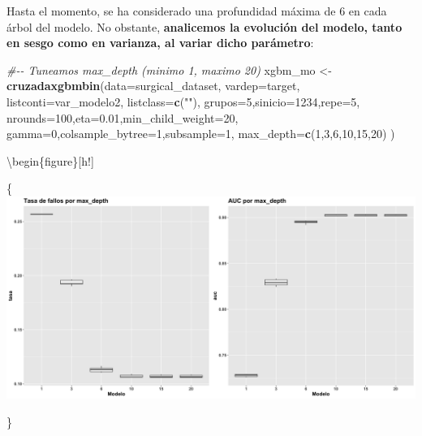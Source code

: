 \documentclass[
]{article}
\newenvironment{Shaded}{\begin{snugshade}}{\end{snugshade}}
\newcommand{\CommentTok}[1]{\textcolor[rgb]{0.56,0.35,0.01}{\textit{#1}}}
\newcommand{\DataTypeTok}[1]{\textcolor[rgb]{0.13,0.29,0.53}{#1}}
\newcommand{\DecValTok}[1]{\textcolor[rgb]{0.00,0.00,0.81}{#1}}
\newcommand{\FloatTok}[1]{\textcolor[rgb]{0.00,0.00,0.81}{#1}}
\newcommand{\KeywordTok}[1]{\textcolor[rgb]{0.13,0.29,0.53}{\textbf{#1}}}
\newcommand{\NormalTok}[1]{#1}
\newcommand{\StringTok}[1]{\textcolor[rgb]{0.31,0.60,0.02}{#1}}
\begin{document}
Hasta el momento, se ha considerado una profundidad máxima de 6 en cada
árbol del modelo. No obstante, \textbf{analicemos la evolución del
modelo, tanto en sesgo como en varianza, al variar dicho parámetro}:

\begin{Shaded}
\begin{Highlighting}[]
\CommentTok{\#{-}{-} Tuneamos max\_depth (minimo 1, maximo 20)}
\NormalTok{xgbm\_mo <{-}}\StringTok{ }\KeywordTok{cruzadaxgbmbin}\NormalTok{(}\DataTypeTok{data=}\NormalTok{surgical\_dataset, }\DataTypeTok{vardep=}\NormalTok{target,}
                            \DataTypeTok{listconti=}\NormalTok{var\_modelo2, }\DataTypeTok{listclass=}\KeywordTok{c}\NormalTok{(}\StringTok{""}\NormalTok{), }
                            \DataTypeTok{grupos=}\DecValTok{5}\NormalTok{,}\DataTypeTok{sinicio=}\DecValTok{1234}\NormalTok{,}\DataTypeTok{repe=}\DecValTok{5}\NormalTok{,}
                            \DataTypeTok{nrounds=}\DecValTok{100}\NormalTok{,}\DataTypeTok{eta=}\FloatTok{0.01}\NormalTok{,}\DataTypeTok{min\_child\_weight=}\DecValTok{20}\NormalTok{,}
                            \DataTypeTok{gamma=}\DecValTok{0}\NormalTok{,}\DataTypeTok{colsample\_bytree=}\DecValTok{1}\NormalTok{,}\DataTypeTok{subsample=}\DecValTok{1}\NormalTok{,}
                            \DataTypeTok{max\_depth=}\KeywordTok{c}\NormalTok{(}\DecValTok{1}\NormalTok{,}\DecValTok{3}\NormalTok{,}\DecValTok{6}\NormalTok{,}\DecValTok{10}\NormalTok{,}\DecValTok{15}\NormalTok{,}\DecValTok{20}\NormalTok{)}
\NormalTok{                        )}
\end{Highlighting}
\end{Shaded}

\textbackslash begin\{figure\}{[}h!{]}

\{\centering \includegraphics[width=0.99\linewidth,height=0.99\textheight,]{./charts/xgboost/max_depth}

\}
\end{document}
